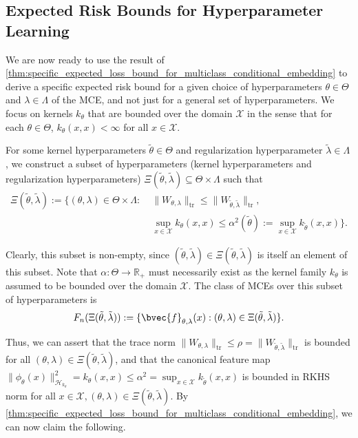 \documentclass[runningheads, envcountsame, a4paper]{llncs}
\begin{document}
		\subsection{Expected Risk Bounds for Hyperparameter Learning}
		\label{app:expected_risk_bounds_for_hyperparameter_learning}

			We are now ready to use the result of \cref{thm:specific_expected_loss_bound_for_multiclass_conditional_embedding} to derive a specific expected risk bound for a given choice of hyperparameters $\theta \in \Theta$ and $\lambda \in \Lambda$ of the \gls{MCE}, and not just for a general set of hyperparameters. We focus on kernels $k_{\theta}$ that are bounded over the domain $\mathcal{X}$ in the sense that for each $\theta \in \Theta$, $k_{\theta}(x, x) < \infty$ for all $x \in \mathcal{X}$.
			
			For some kernel hyperparameters $\tilde{\theta} \in \Theta$ and regularization hyperparameter $\tilde{\lambda} \in \Lambda$, we construct a subset of hyperparameters (kernel hyperparameters and regularization hyperparameters) $\Xi(\tilde{\theta}, \tilde{\lambda}) \subseteq \Theta \times \Lambda$ such that
			\begin{equation}
			\begin{aligned}
				\Xi(\tilde{\theta}, \tilde{\lambda}) := \{ (\theta, \lambda) \in \Theta \times \Lambda :\; &\| W_{\theta, \lambda} \|_{\mathrm{tr}} \leq \| W_{\tilde{\theta}, \tilde{\lambda}} \|_{\mathrm{tr}}, \\
				&\sup_{x \in \mathcal{X}} k_{\theta}(x, x) \leq \alpha^{2}(\tilde{\theta}) := \sup_{x \in \mathcal{X}} k_{\tilde{\theta}}(x, x) \}.
			\end{aligned}
			\label{eq:hyperparameter_subset_definition}
			\end{equation}
			
			Clearly, this subset is non-empty, since $(\tilde{\theta}, \tilde{\lambda}) \in \Xi(\tilde{\theta}, \tilde{\lambda})$ is itself an element of this subset. Note that $\alpha : \Theta \to \mathbb{R}_{+}$ must necessarily exist as the kernel family $k_{\theta}$ is assumed to be bounded over the domain $\mathcal{X}$. The class of \glspl{MCE} over this subset of hyperparameters is 
			\begin{equation}
				F_{n}(\Xi(\tilde{\theta}, \tilde{\lambda})) := \{\bvec{f}_{\theta, \lambda}(x) : (\theta, \lambda) \in \Xi(\tilde{\theta}, \tilde{\lambda}) \}.
			\end{equation}
			
			Thus, we can assert that the trace norm $\| W_{\theta, \lambda} \|_{\mathrm{tr}} \leq \rho = \| W_{\tilde{\theta}, \tilde{\lambda}} \|_{\mathrm{tr}}$ is bounded for all $(\theta, \lambda) \in \Xi(\tilde{\theta}, \tilde{\lambda})$, and that the canonical feature map $\| \phi_{\theta}(x) \|_{\mathcal{H}_{k_{\theta}}}^{2} = k_{\theta}(x, x) \leq \alpha^{2} = \sup_{x \in \mathcal{X}} k_{\tilde{\theta}}(x, x)$ is bounded in \gls{RKHS} norm for all $x \in \mathcal{X}, (\theta, \lambda) \in \Xi(\tilde{\theta}, \tilde{\lambda})$. By \cref{thm:specific_expected_loss_bound_for_multiclass_conditional_embedding}, we can now claim the following.
			
\end{document}
